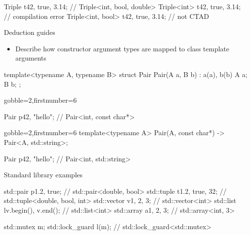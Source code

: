 \begin{advanced}
\begin{frame}[fragile]
\begin{cppcode*}{}
    Triple t{42, true, 3.14}; // Triple<int, bool, double>
    Triple<int> t{42, true, 3.14}; // compilation error
    Triple<int, bool> t{42, true, 3.14}; // not CTAD
  \end{cppcode*}
\end{frame}

\begin{frame}[fragile]
  \begin{block}{Deduction guides}
    \begin{itemize}
    \item Describe how constructor argument types are mapped to class template arguments
    \end{itemize}
  \end{block}
  \begin{cppcode}
    template<typename A, typename B>
    struct Pair {
     Pair(A a, B b) : a(a), b(b) {}
     A a; B b;
    };
  \end{cppcode}
  \begin{overprint}[\columnwidth]
    \begin{cppcode*}{gobble=2,firstnumber=6}



      Pair p{42, "hello"}; // Pair<int, const char*>
    \end{cppcode*}
    \begin{cppcode*}{gobble=2,firstnumber=6}
      template<typename A>
      Pair(A, const char*) -> Pair<A, std::string>;

      Pair p{42, "hello"}; // Pair<int, std::string>
    \end{cppcode*}
  \end{overprint}
\end{frame}

\begin{frame}[fragile]
  \begin{block}{Standard library examples}
    \begin{cppcode*}{}
      std::pair p{1.2, true}; // std::pair<double, bool>
      std::tuple t{1.2, true, 32};
                        // std::tuple<double, bool, int>
      std::vector v{1, 2, 3}; // std::vector<int>
      std::list l{v.begin(), v.end()}; // std::list<int>
      std::array a{1, 2, 3}; // std::array<int, 3>

      std::mutex m;
      std::lock_guard l(m); // std::lock_guard<std::mutex>
    \end{cppcode*}
  \end{block}
\end{frame}

\end{advanced}

